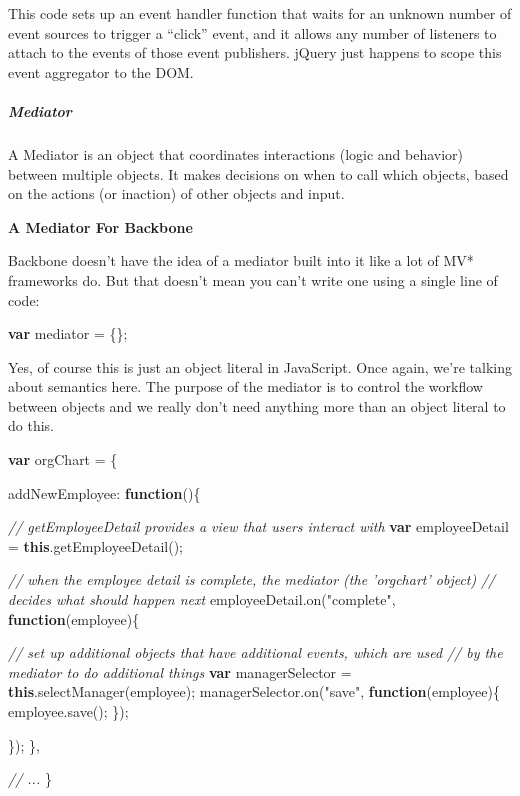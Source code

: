 \documentclass[9pt]{book}
\newenvironment{Shaded}{}{}
\newcommand{\KeywordTok}[1]{\textcolor[rgb]{0.00,0.44,0.13}{\textbf{{#1}}}}
\newcommand{\DataTypeTok}[1]{\textcolor[rgb]{0.56,0.13,0.00}{{#1}}}
\newcommand{\StringTok}[1]{\textcolor[rgb]{0.25,0.44,0.63}{{#1}}}
\newcommand{\CommentTok}[1]{\textcolor[rgb]{0.38,0.63,0.69}{\textit{{#1}}}}
\newcommand{\OtherTok}[1]{\textcolor[rgb]{0.00,0.44,0.13}{{#1}}}
\newcommand{\FunctionTok}[1]{\textcolor[rgb]{0.02,0.16,0.49}{{#1}}}
\newcommand{\NormalTok}[1]{{#1}}
\begin{document}
This code sets up an event handler function that waits for an unknown
number of event sources to trigger a ``click'' event, and it allows any
number of listeners to attach to the events of those event publishers.
jQuery just happens to scope this event aggregator to the DOM.

\subparagraph{Mediator}\label{mediator}

A Mediator is an object that coordinates interactions (logic and
behavior) between multiple objects. It makes decisions on when to call
which objects, based on the actions (or inaction) of other objects and
input.

\textbf{A Mediator For Backbone}

Backbone doesn't have the idea of a mediator built into it like a lot of
MV* frameworks do. But that doesn't mean you can't write one using a
single line of code:

\begin{Shaded}
\begin{Highlighting}[]
\KeywordTok{var} \NormalTok{mediator = \{\};}
\end{Highlighting}
\end{Shaded}

Yes, of course this is just an object literal in JavaScript. Once again,
we're talking about semantics here. The purpose of the mediator is to
control the workflow between objects and we really don't need anything
more than an object literal to do this.

\begin{Shaded}
\begin{Highlighting}[]
\KeywordTok{var} \NormalTok{orgChart = \{}

  \DataTypeTok{addNewEmployee}\NormalTok{: }\KeywordTok{function}\NormalTok{()\{}

    \CommentTok{// getEmployeeDetail provides a view that users interact with}
    \KeywordTok{var} \NormalTok{employeeDetail = }\KeywordTok{this}\NormalTok{.}\FunctionTok{getEmployeeDetail}\NormalTok{();}

    \CommentTok{// when the employee detail is complete, the mediator (the 'orgchart' object)}
    \CommentTok{// decides what should happen next}
    \OtherTok{employeeDetail}\NormalTok{.}\FunctionTok{on}\NormalTok{(}\StringTok{"complete"}\NormalTok{, }\KeywordTok{function}\NormalTok{(employee)\{}

      \CommentTok{// set up additional objects that have additional events, which are used}
      \CommentTok{// by the mediator to do additional things}
      \KeywordTok{var} \NormalTok{managerSelector = }\KeywordTok{this}\NormalTok{.}\FunctionTok{selectManager}\NormalTok{(employee);}
      \OtherTok{managerSelector}\NormalTok{.}\FunctionTok{on}\NormalTok{(}\StringTok{"save"}\NormalTok{, }\KeywordTok{function}\NormalTok{(employee)\{}
        \OtherTok{employee}\NormalTok{.}\FunctionTok{save}\NormalTok{();}
      \NormalTok{\});}

    \NormalTok{\});}
  \NormalTok{\},}

  \CommentTok{// ...}
\NormalTok{\}}
\end{Highlighting}
\end{Shaded}
\end{document}
